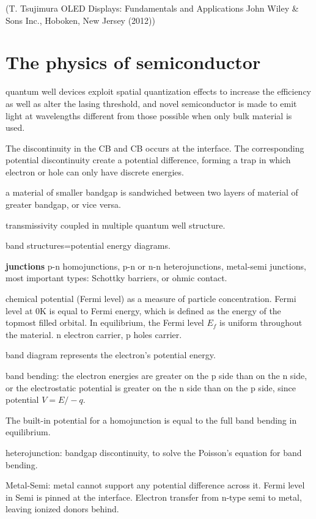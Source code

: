 (T. Tsujimura OLED Displays: Fundamentals and Applications John Wiley \& Sons Inc., Hoboken, New Jersey (2012))

\section{The physics of semiconductor}

quantum well devices exploit spatial quantization effects to increase the efficiency as well as alter the lasing threshold, and  novel semiconductor is made to emit light at wavelengths different from those possible when only bulk material is used.


The discontinuity in the CB and CB occurs at the interface. The corresponding potential discontinuity create a potential difference, forming a trap in which electron or hole can only have discrete energies.

a material of smaller bandgap is sandwiched between two layers of material of greater bandgap, or vice versa.

transmissivity coupled in multiple quantum well structure.

band structures=potential energy diagrams.

\textbf{junctions}
p-n homojunctions, p-n or n-n heterojunctions, metal-semi junctions, most important types: Schottky barriers, or ohmic contact.

chemical potential (Fermi level) as a measure of particle concentration.  Fermi level at 0K is equal to Fermi energy, which is defined as the energy of the topmost filled orbital. In equilibrium, the Fermi level $E_f$ is uniform throughout the material. n electron carrier, p holes carrier.

band diagram represents the electron's potential energy.

band bending: the electron energies are greater on the p side than on the n side, or the electrostatic potential is greater on the n side than on the p side, since potential $V = E/-q$.

The built-in potential for a homojunction is equal to the full band bending in equilibrium.

heterojunction: bandgap discontinuity, to solve the Poisson's equation for band bending.

Metal-Semi: metal cannot support any potential difference across it. Fermi level in Semi is pinned at the interface. Electron transfer from n-type semi to metal, leaving ionized donors behind.


